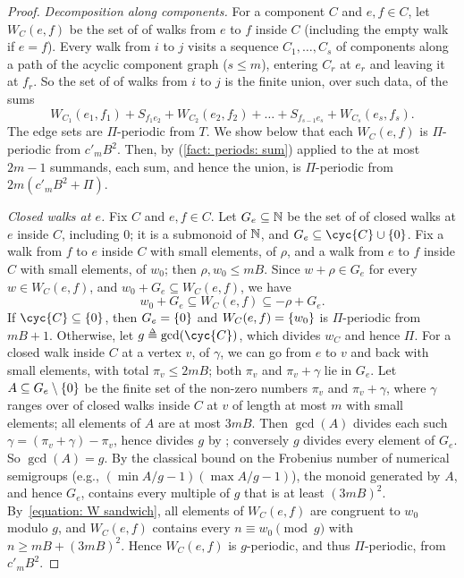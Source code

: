 \lemmaWalkPeriods*
\begin{proof}
    \emph{Decomposition along components.}
    For a component $C$ and $e, f \in C$, let $W_C(e, f)$ be the set of  of walks from $e$ to $f$ inside $C$ (including the empty walk if $e = f$).
    Every walk from $i$ to $j$ visits a sequence $C_1, \dots, C_s$ of components along a path of the acyclic component graph ($s \le m$), entering $C_r$ at $e_r$ and leaving it at $f_r$.
    So the set of  of walks from $i$ to $j$ is the finite union, over such data, of the sums
    \[W_{C_1}(e_1, f_1) + S_{f_1 e_2} + W_{C_2}(e_2, f_2) + \dots + S_{f_{s-1} e_s} + W_{C_s}(e_s, f_s).\]
    The edge sets are $\Pi$-periodic from $T$.
    We show below that each $W_C(e, f)$ is $\Pi$-periodic from $c'_m B^2$.
    Then, by (\ref{fact: periods: sum}) applied to the at most $2m - 1$ summands, each sum, and hence the union, is $\Pi$-periodic from $2m (c'_m B^{2} + \Pi)$.

    \emph{Closed walks at $e$.}
    Fix $C$ and $e, f \in C$.
    Let $G_e \subseteq \mathbb{N}$ be the set of  of closed walks at $e$ inside $C$, including $0$; it is a submonoid of $\mathbb{N}$, and $G_e \subseteq \cyc{C} \cup \set{0}$.
    Fix a walk from $f$ to $e$ inside $C$ with small elements, of  $\rho$, and a walk from $e$ to $f$ inside $C$ with small elements, of  $w_0$; then $\rho, w_0 \le m B$.
    Since $w + \rho \in G_e$ for every $w \in W_C(e, f)$, and $w_0 + G_e \subseteq W_C(e, f)$, we have
    \begin{equation}
        w_0 + G_e \subseteq W_C(e, f) \subseteq -\rho + G_e. \label{equation: W sandwich}
    \end{equation}
    If $\cyc{C} \subseteq \set{0}$, then $G_e = \{0\}$ and $W_C(e, f) = \{w_0\}$ is $\Pi$-periodic from $m B + 1$.
    Otherwise, let $g \defeq \gcd(\cyc{C})$, which divides $w_C$ and hence $\Pi$.
    For a closed walk inside $C$ at a vertex $v$, of  $\gamma$, we can go from $e$ to $v$ and back with small elements, with total  $\pi_v \le 2 m B$; both $\pi_v$ and $\pi_v + \gamma$ lie in $G_e$.
    Let $A \subseteq G_e \setminus \{0\}$ be the finite set of the non-zero numbers $\pi_v$ and $\pi_v + \gamma$, where $\gamma$ ranges over  of closed walks inside $C$ at $v$ of length at most $m$ with small elements; all elements of $A$ are at most $3 m B$.
    Then $\gcd(A)$ divides each such $\gamma = (\pi_v + \gamma) - \pi_v$, hence divides $g$ by ; conversely $g$ divides every element of $G_e$.
    So $\gcd(A) = g$.
    By the classical bound on the Frobenius number of numerical semigroups (e.g., $(\min A/g - 1)(\max A/g - 1)$), the monoid generated by $A$, and hence $G_e$, contains every multiple of $g$ that is at least $(3 m B)^{2}$.
    By~\eqref{equation: W sandwich}, all elements of $W_C(e, f)$ are congruent to $w_0$ modulo $g$, and $W_C(e, f)$ contains every $n \equiv w_0 \pmod g$ with $n \ge m B + (3 m B)^{2}$.
    Hence $W_C(e, f)$ is $g$-periodic, and thus $\Pi$-periodic, from $c'_m B^{2}$.
\end{proof}
